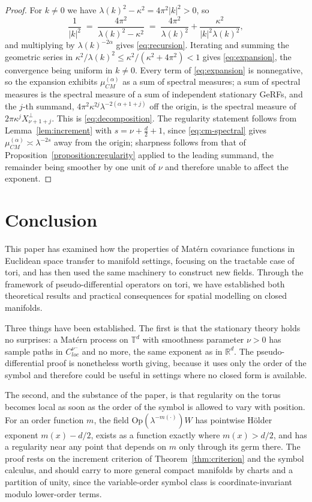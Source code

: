 \documentclass[pdflatex,sn-mathphys,Numbered]{sn-jnl}
\theoremstyle{thmstyleone}%
\theoremstyle{thmstyletwo}%
\theoremstyle{thmstylethree}%
\newcommand{\RR}{\mathbb{R}}
\newcommand{\TT}{\mathbb{T}}
\newcommand{\Op}{\mathrm{Op}}
\begin{document}
\begin{proof}
For $k \neq 0$ we have $\lambda(k)^2 - \kappa^2 = 4\pi^2|k|^2 > 0$, so
\[
    \frac{1}{|k|^2}
    \;=\; \frac{4\pi^2}{\lambda(k)^2 - \kappa^2}
    \;=\; \frac{4\pi^2}{\lambda(k)^2} + \frac{\kappa^2}{|k|^2\lambda(k)^2} ,
\]
and multiplying by $\lambda(k)^{-2\alpha}$ gives \eqref{eq:recursion}. Iterating
and summing the geometric series in
$\kappa^2/\lambda(k)^2 \leq \kappa^2/(\kappa^2+4\pi^2) < 1$ gives
\eqref{eq:expansion}, the convergence being uniform in $k \neq 0$. Every term of
\eqref{eq:expansion} is nonnegative, so the expansion exhibits
$\mu^{(\alpha)}_{CM}$ as a sum of spectral measures; a sum of spectral measures
is the spectral measure of a sum of independent stationary GeRFs, and the $j$-th
summand, $4\pi^2\kappa^{2j}\lambda^{-2(\alpha+1+j)}$ off the origin, is the
spectral measure of $2\pi\kappa^{j}X^{\perp}_{\nu+1+j}$. This is
\eqref{eq:decomposition}. The regularity statement follows from
Lemma~\ref{lem:increment} with $s = \nu + \tfrac d2 + 1$, since
\eqref{eq:cm-spectral} gives $\mu^{(\alpha)}_{CM} \asymp \lambda^{-2s}$ away
from the origin; sharpness follows from that of
Proposition~\ref{proposition:regularity} applied to the leading summand, the
remainder being smoother by one unit of $\nu$ and therefore unable to affect the
exponent.
\end{proof}

\section{Conclusion}
\label{sec:conclusion}

This paper has examined how the properties of Mat\'ern covariance functions in
Euclidean space transfer to manifold settings, focusing on the tractable case of
tori, and has then used the same machinery to construct new fields. Through the
framework of
pseudo-differential operators on tori, we have established both theoretical
results and practical consequences for spatial modelling on closed manifolds.

Three things have been established. The first is that the stationary theory holds
no surprises: a Mat\'ern process on $\TT^d$ with smoothness parameter $\nu > 0$
has sample paths in $C^{\nu^-}_{loc}$ and no more, the same exponent as in
$\RR^d$. The pseudo-differential
proof is nonetheless worth giving, because it uses only the order of the symbol
and therefore could be useful in settings
where no closed form is available.

The second, and the substance of the paper, is that regularity on the torus
becomes local as soon as the order of the symbol is allowed
to vary with position. For an order function $m$, the field
$\Op(\lambda^{-m(\cdot)})W$ has pointwise H\"older exponent $m(x) - d/2$, exists
as a function exactly where $m(x) > d/2$, and has a regularity near any point
that depends on $m$ only through its germ there. The proof rests on the increment criterion of Theorem~\ref{thm:criterion} and the symbol
calculus, and should carry to more general compact manifolds by charts and a
partition of unity, since the variable-order symbol class is
coordinate-invariant modulo lower-order terms.
\end{document}
